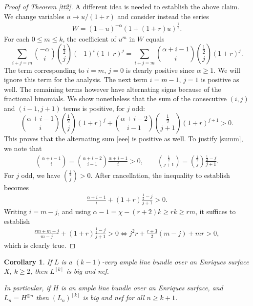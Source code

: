 \documentclass[10pt,a4paper]{amsart}
\numberwithin{equation}{section}
\newtheorem{Corollary}[Theorem]{Corollary}
\begin{document}
\begin{proof}[Proof of Theorem \ref{tt2}]
A different idea is needed to establish the above claim. We change variables $u\mapsto u/(1+r)$ and consider instead the series
\begin{gather*}
W=(1-u)^{-\alpha}(1+(1+r)u)^{\frac{1}{2}}.
\end{gather*}
For each $0\leq m\leq k$, the coefficient of $u^m$ in $W$ equals
 \begin{equation}\label{eee}
 \sum_{i+j=m} \binom {-\alpha}{i} \binom{\frac{1}{2}}{j} (-1)^{i} (1+r)^j=\sum_{i+j=m} \binom{\alpha+i-1}{i} \binom{\frac{1}{2}}{j} (1+r)^j.
 \end{equation}
 The term corresponding to $i=m$, $j=0$ is clearly positive since $\alpha\geq 1$. We will ignore this term for the analysis. The next term $i=m-1$, $j=1$ is positive as well. The remaining terms however have alternating signs because of the fractional binomials. We show nonetheless that the sum of the consecutive $(i, j)$ and $(i-1, j+1)$ terms is positive, for $j$ odd:
\begin{equation}\label{summ}
\binom {\alpha+i-1}{i} \binom{\frac{1}{2}}{j} (1+r)^j+\binom {\alpha+i-2}{i-1} \binom{\frac{1}{2}}{j+1} (1+r)^{j+1}>0.
\end{equation}
This proves that the alternating sum \eqref{eee} is positive as well. To justify \eqref{summ}, we note that
\begin{gather*}
\binom {\alpha+i-1}{i}=\binom {\alpha+i-2}{i-1} \frac{\alpha+i-1}{i}>0, \qquad \binom{\frac{1}{2}}{j+1} = \binom{\frac{1}{2}}{j} \frac{\frac{1}{2}-j}{j+1}.
\end{gather*}
For $j$ odd, we have $\binom{\frac{1}{2}}{j} >0$. After cancellation, the inequality to establish becomes
\begin{gather*}
\frac{\alpha+i-1}{i}+(1+r) \frac{\frac{1}{2}-j}{j+1}>0.
\end{gather*}
Writing $i=m-j$, and using $\alpha-1=\chi-(r+2)k\geq rk\geq rm$, it suffices to establish
\begin{gather*}
\frac{rm+m-j}{m-j}+(1+r) \frac{\frac{1}{2}-j}{j+1}>0\iff j^2r+\frac{r+3}{2} (m-j)+mr>0,
\end{gather*} which is clearly true.
\end{proof}

\begin{Corollary}
If $L$ is a $(k-1)$-very ample line bundle over an Enriques surface $X$, $k\geq 2$, then $L^{[k]}$ is big and nef.

In particular, if $H$ is an ample line bundle over an Enriques surface, and $L_n=H^{\otimes n}$ then $(L_n)^{[k]}$ is big and nef for all $n\geq k+1$.
\end{Corollary}
\end{document}
